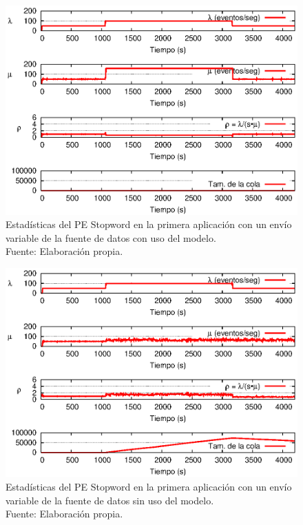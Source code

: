 \begin{figure}[!ht]
    \centering
    \captionsetup{justification=centering}
    \includegraphics[scale=1]{images/exp/app1/normal/cm/statusStopwordPE.eps}
    \caption[Estad\'isticas del PE Stopword en la primera aplicaci\'on con un env\'io variable de la fuente de datos con uso del modelo.]{Estad\'isticas del PE Stopword en la primera aplicaci\'on con un env\'io variable de la fuente de datos con uso del modelo.\\Fuente: Elaboraci\'on propia.}
    \label{fig:app1-normal-statusStopwordPE-cm}
\end{figure}

\begin{figure}[!ht]
    \centering
    \captionsetup{justification=centering}
    \includegraphics[scale=1]{images/exp/app1/normal/sm/statusStopwordPE.eps}
    \caption[Estad\'isticas del PE Stopword en la primera aplicaci\'on con un env\'io variable de la fuente de datos sin uso del modelo.]{Estad\'isticas del PE Stopword en la primera aplicaci\'on con un env\'io variable de la fuente de datos sin uso del modelo.\\Fuente: Elaboraci\'on propia.}
    \label{fig:app1-normal-statusStopwordPE-sm}
\end{figure}

